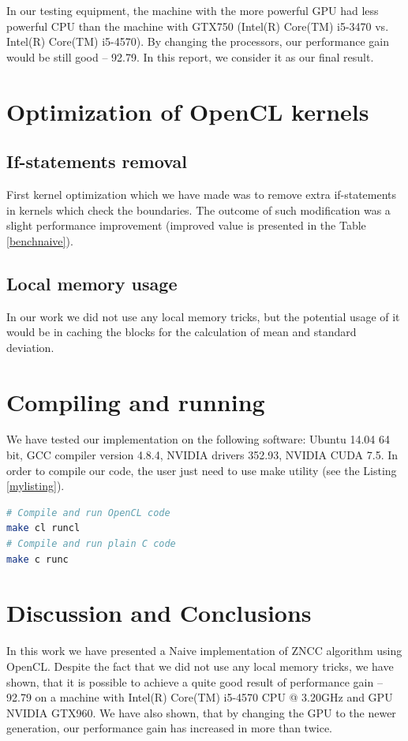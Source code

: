 \documentclass[conference]{IEEEtran}
\begin{document}
In our testing equipment, the machine with the more powerful GPU had less powerful CPU than the machine with GTX750 (Intel(R) Core(TM) i5-3470 vs. Intel(R) Core(TM) i5-4570). By changing the processors, our performance gain would be still good -- 92.79. In this report, we consider it as our final result.

\section{Optimization of OpenCL kernels}\label{sec:Optimization}
\subsection{If-statements removal}
First kernel optimization which we have made was to remove extra if-statements in kernels which check the boundaries. The outcome of such modification was a slight performance improvement (improved value is presented in the Table \ref{benchnaive}).

\subsection{Local memory usage}
In our work we did not use any local memory tricks, but the potential usage of it would be in caching the blocks for the calculation of mean and standard deviation.

\section{Compiling and running}
We have tested our implementation on the following software: Ubuntu 14.04 64 bit, GCC compiler version 4.8.4, NVIDIA drivers 352.93, NVIDIA CUDA 7.5. In order to compile our code, the user just need to use make utility (see the Listing \ref{mylisting}).

\begin{lstlisting}[language=bash,caption={Compiling commands},label={mylisting}]
# Compile and run OpenCL code
make cl runcl
# Compile and run plain C code
make c runc
\end{lstlisting}

\section{Discussion and Conclusions}
In this work we have presented a Naive implementation of ZNCC algorithm using OpenCL. Despite the fact that we did not use any local memory tricks, we have shown, that it is possible to  achieve a quite good result of performance gain -- 92.79 on a machine with Intel(R) Core(TM) i5-4570 CPU @ 3.20GHz and GPU NVIDIA GTX960. We have also shown, that by changing the GPU to the newer generation, our performance gain has increased in more than twice.



\end{document}

